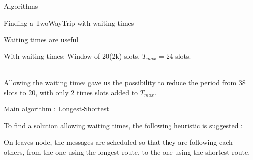 \documentclass[a4paper,10pt]{report}
\begin{document}
\begin{chapter}{Algorithms}
\begin{section}{Finding a TwoWayTrip with waiting times}
\begin{subsection}{Waiting times are useful}
{{{
  }
  
    With waiting times: Window of 20(2k) slots, $T_{max}$ = 24 slots.

  }}\\
  
  Allowing the waiting times gave us the possibility to reduce the period from 38 slots to 20, with only 2 times slots added to $T_{max}$.
\end{subsection}
\begin{subsection}{Main algorithm : Longest-Shortest}
 

To find a solution allowing waiting times, the following heuristic is suggested :

On leaves node, the messages are scheduled so that they are following each others, from the one using the longest route, to the one using the shortest route.


\end{subsection}
\end{section}
\end{chapter}
\end{document}
